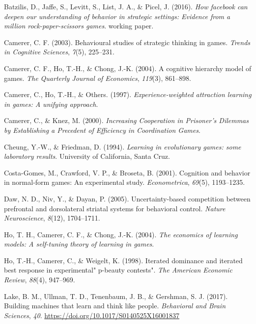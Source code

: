 \documentclass[man,floatsintext]{apa6}
\begin{document}
\leavevmode\hypertarget{ref-batzilis}{}%
Batzilis, D., Jaffe, S., Levitt, S., List, J. A., \& Picel, J. (2016). \emph{How facebook can deepen our understanding of behavior in strategic settings: Evidence from a million rock-paper-scissors games}. working paper.

\leavevmode\hypertarget{ref-camerer2003behavioural}{}%
Camerer, C. F. (2003). Behavioural studies of strategic thinking in games. \emph{Trends in Cognitive Sciences}, \emph{7}(5), 225--231.

\leavevmode\hypertarget{ref-camerer2004cognitive}{}%
Camerer, C. F., Ho, T.-H., \& Chong, J.-K. (2004). A cognitive hierarchy model of games. \emph{The Quarterly Journal of Economics}, \emph{119}(3), 861--898.

\leavevmode\hypertarget{ref-camerer1997experience}{}%
Camerer, C., Ho, T.-H., \& Others. (1997). \emph{Experience-weighted attraction learning in games: A unifying approach}.

\leavevmode\hypertarget{ref-knez2000}{}%
Camerer, C., \& Knez, M. (2000). \emph{Increasing Cooperation in Prisoner's Dilemmas by Establishing a Precedent of Efficiency in Coordination Games}.

\leavevmode\hypertarget{ref-cheung1994learning}{}%
Cheung, Y.-W., \& Friedman, D. (1994). \emph{Learning in evolutionary games: some laboratory results}. University of California, Santa Cruz.

\leavevmode\hypertarget{ref-costa2001cognition}{}%
Costa-Gomes, M., Crawford, V. P., \& Broseta, B. (2001). Cognition and behavior in normal-form games: An experimental study. \emph{Econometrica}, \emph{69}(5), 1193--1235.

\leavevmode\hypertarget{ref-daw2005uncertainty}{}%
Daw, N. D., Niv, Y., \& Dayan, P. (2005). Uncertainty-based competition between prefrontal and dorsolateral striatal systems for behavioral control. \emph{Nature Neuroscience}, \emph{8}(12), 1704--1711.

\leavevmode\hypertarget{ref-ho2004economics}{}%
Ho, T. H., Camerer, C. F., \& Chong, J.-K. (2004). \emph{The economics of learning models: A self-tuning theory of learning in games}.

\leavevmode\hypertarget{ref-ho1998iterated}{}%
Ho, T.-H., Camerer, C., \& Weigelt, K. (1998). Iterated dominance and iterated best response in experimental" p-beauty contests". \emph{The American Economic Review}, \emph{88}(4), 947--969.

\leavevmode\hypertarget{ref-Lake2017}{}%
Lake, B. M., Ullman, T. D., Tenenbaum, J. B., \& Gershman, S. J. (2017). Building machines that learn and think like people. \emph{Behavioral and Brain Sciences}, \emph{40}. \url{https://doi.org/10.1017/S0140525X16001837}
\end{document}
